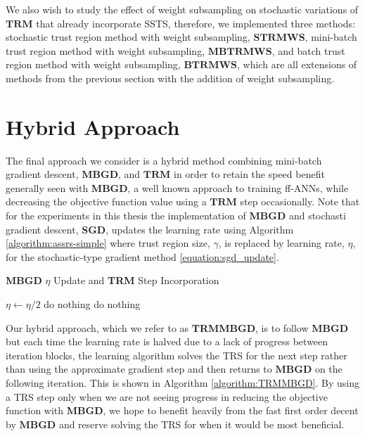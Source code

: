\documentclass[letterpaper,12pt,titlepage,oneside,final]{book}
\begin{document}
	We also wish to study the effect of weight subsampling on stochastic variations of $\mathbf{TRM}$ that already incorporate SSTS, therefore, we implemented three methods: stochastic trust region method with weight subsampling, $\mathbf{STRMWS}$, mini-batch trust region method with weight subsampling, $\mathbf{MBTRMWS}$, and batch trust region method with weight subsampling, $\mathbf{BTRMWS}$, which are all extensions of methods from the previous section with the addition of weight subsampling.

	
	\section{Hybrid Approach}
	
	The final approach we consider is a hybrid method combining mini-batch gradient descent, $\textbf{MBGD}$, and $\textbf{TRM}$ in order to retain the speed benefit generally seen with $\mathbf{MBGD}$, a well known approach to training ff-ANNs, while decreasing the objective function value using a $\textbf{TRM}$ step occasionally. Note that for the experiments in this thesis the implementation of \textbf{MBGD} and stochasti gradient descent, \textbf{SGD}, updates the learning rate using Algorithm \ref{algorithm:assrs-simple} where trust region size, $\gamma$, is replaced by learning rate, $\eta$, for the stochastic-type gradient method \ref{equation:sgd_update}. 
	
	\begin{algorithm}
		\caption{\textbf{MBGD} $\eta$ Update and \textbf{TRM} Step Incorporation}
		\begin{algorithmic}[1]
			\State $\eta \gets \eta / 2$
			\State [Take one \textbf{TRM} step with $\gamma = \eta$]
			\Else
			\State do nothing
			\EndIf
			\Else
			\State do nothing
			\EndIf
			\EndFunction
		\end{algorithmic}	
		\label{algorithm:TRMMBGD}	
	\end{algorithm}
	
	Our hybrid approach, which we refer to as \textbf{TRMMBGD}, is to follow $\mathbf{MBGD}$ but each time the learning rate is halved due to a lack of progress between iteration blocks, the learning algorithm solves the TRS for the next step rather than using the approximate gradient step and then returns to $\mathbf{MBGD}$ on the following iteration. This is shown in Algorithm \ref{algorithm:TRMMBGD}. By using a TRS step only when we are not seeing progress in reducing the objective function with \textbf{MBGD}, we hope to benefit heavily from the fast first order decent by $\mathbf{MBGD}$ and reserve solving the TRS for when it would be most beneficial.
	
\end{document}
